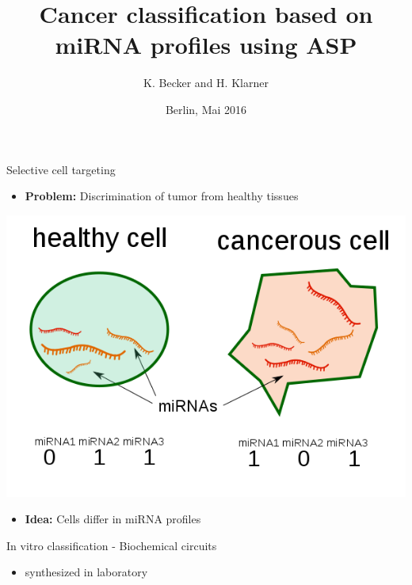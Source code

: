 \documentclass[10pt,dvipsnames]{beamer}
\title{Cancer classification based on miRNA profiles using ASP}
\author{K. Becker and H. Klarner}
\date{Berlin, Mai 2016}
\institute{
Freie Universität Berlin, Germany
}
\begin{document}
\frame{\titlepage}




\begin{frame}{Selective cell targeting}
\large
\begin{itemize}
\item \textbf{Problem:} Discrimination of tumor from healthy tissues
\end{itemize}
\vspace{0.5cm}
\begin{center}
\includegraphics[scale=0.3]{cells1.png}
\end{center}
\vspace{0.5cm}
\begin{itemize}
\item \textbf{Idea:} Cells differ in miRNA profiles
\end{itemize}
\end{frame}


\begin{frame}{In vitro classification - Biochemical circuits}
\begin{itemize}
\item synthesized in laboratory
\end{itemize}
\end{frame}
\end{document}
